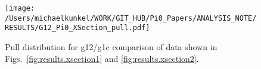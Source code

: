 \begin{figure}[htpb]\begin{center}
		\texttt{[image: /Users/michaelkunkel/WORK/GIT\_HUB/Pi0\_Papers/ANALYSIS\_NOTE/RESULTS/G12\_Pi0\_XSection\_pull.pdf]}
		\caption{\label{fig:pi0.xsec.pull}Pull distribution for g12/g1c comparison of data shown in Figs.~\ref{fig:results.xsection1} and \ref{fig:results.xsection2}.}
	\end{center}\end{figure}

\FloatBarrier
%
%
